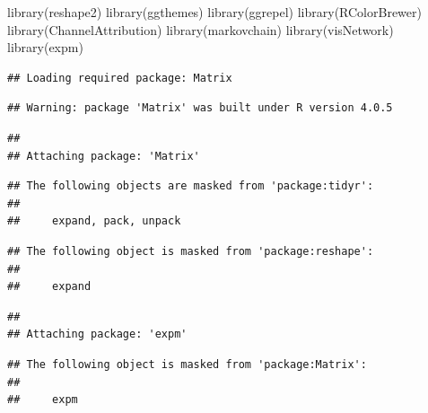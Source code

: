 \documentclass[
]{book}
\newenvironment{Shaded}{\begin{snugshade}}{\end{snugshade}}
\newcommand{\FunctionTok}[1]{\textcolor[rgb]{0.00,0.00,0.00}{#1}}
\newcommand{\NormalTok}[1]{#1}
\begin{document}
\begin{Shaded}
\begin{Highlighting}[]
\FunctionTok{library}\NormalTok{(reshape2)}
\FunctionTok{library}\NormalTok{(ggthemes)}
\FunctionTok{library}\NormalTok{(ggrepel)}
\FunctionTok{library}\NormalTok{(RColorBrewer)}
\FunctionTok{library}\NormalTok{(ChannelAttribution)}
\FunctionTok{library}\NormalTok{(markovchain)}
\FunctionTok{library}\NormalTok{(visNetwork)}
\FunctionTok{library}\NormalTok{(expm)}
\end{Highlighting}
\end{Shaded}

\begin{verbatim}
## Loading required package: Matrix
\end{verbatim}

\begin{verbatim}
## Warning: package 'Matrix' was built under R version 4.0.5
\end{verbatim}

\begin{verbatim}
## 
## Attaching package: 'Matrix'
\end{verbatim}

\begin{verbatim}
## The following objects are masked from 'package:tidyr':
## 
##     expand, pack, unpack
\end{verbatim}

\begin{verbatim}
## The following object is masked from 'package:reshape':
## 
##     expand
\end{verbatim}

\begin{verbatim}
## 
## Attaching package: 'expm'
\end{verbatim}

\begin{verbatim}
## The following object is masked from 'package:Matrix':
## 
##     expm
\end{verbatim}
\end{document}
